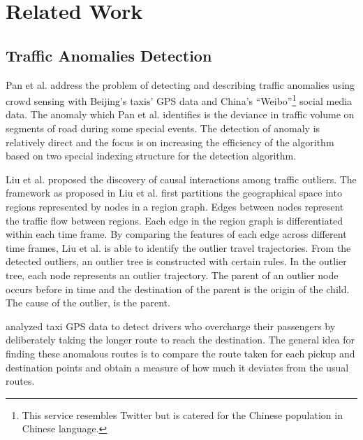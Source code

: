 \documentclass{sig-alternate}
\begin{document}

\section{Related Work}
\label{sec:related}

\subsection{Traffic Anomalies Detection}

Pan et al. \cite{Pan2013} address the problem of detecting and describing traffic anomalies using crowd sensing with Beijing's taxis' GPS data and China's ``Weibo''\footnote{This service resembles Twitter but is catered for the Chinese population in Chinese language.} social media data. The anomaly which Pan et al. \cite{Pan2013} identifies is the deviance in traffic volume on segments of road during some special events. The detection of anomaly is relatively direct and the focus is on increasing the efficiency of the algorithm based on two special indexing structure for the detection algorithm.

Liu et al. \cite{Liu2011} proposed the discovery of causal interactions among traffic outliers. The framework as proposed in Liu et al.\cite{Liu2011} first partitions the geographical space into regions represented by nodes in a region graph. Edges between nodes represent the traffic flow between regions. Each edge in the region graph is differentiated within each time frame. By comparing the features of each edge across different time frames, Liu et al. is able to identify the outlier travel trajectories. From the detected outliers, an outlier tree is constructed with certain rules. In the outlier tree, each node represents an outlier trajectory. The parent of an outlier node occurs before in time and the destination of the parent is the origin of the child. The cause of the outlier, is the parent.

\cite{Ge2011,Zhang2011,Zhang2012} analyzed taxi GPS data to detect drivers who overcharge their passengers by deliberately taking the longer route to reach the destination. The general idea for finding these anomalous routes is to compare the route taken for each pickup and destination points and obtain a measure of how much it deviates from the usual routes.
\end{document}
